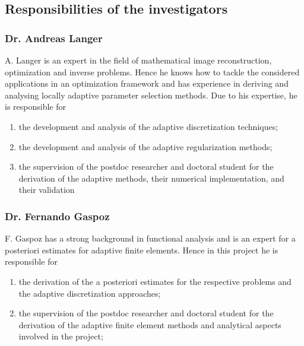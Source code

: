 \documentclass[enabledeprecatedfontcommands,cleardoublepage=empty,headsepline,twoside,11pt,DIV=15,BCOR=12mm,final]{scrartcl}
\begin{document}

\subsection{Responsibilities of the investigators}


\subsubsection{Dr. Andreas Langer}

A. Langer is an expert in the field of mathematical image reconstruction, optimization and inverse problems. Hence he knows how to tackle the considered applications in an optimization framework and has experience in deriving and analysing locally adaptive parameter selection methods. Due to his expertise, he is responsible for 
\begin{enumerate}[(1)]
\item the development and analysis of the adaptive discretization techniques;
\item the development and analysis of the adaptive regularization methods;
\item the supervision of the postdoc researcher and doctoral student for the derivation of the adaptive methods, their numerical implementation, and their validation  
\end{enumerate} 



\subsubsection{Dr. Fernando Gaspoz}
F. Gaspoz has a strong background in functional analysis and is an expert for a posteriori estimates for adaptive finite elements. Hence in this project he is responsible for 
\begin{enumerate}[(1)]
\item  the derivation of the a posteriori estimates for the respective problems and the adaptive discretization approaches;
\item the supervision of the postdoc researcher and doctoral student for the derivation of the adaptive finite element methods and analytical aspects involved in the project;
\end{enumerate}
\end{document}
